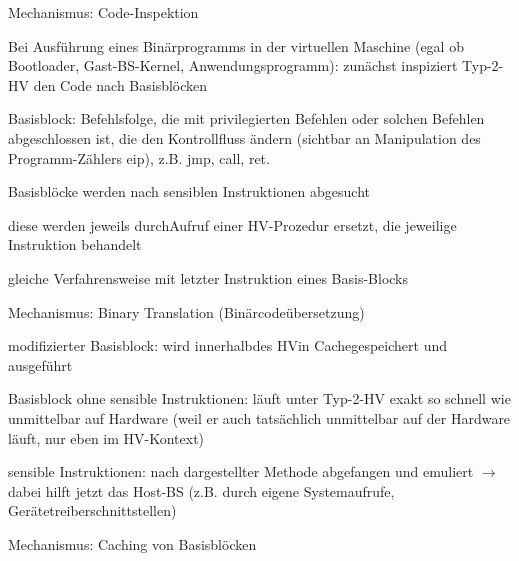 \documentclass[a4paper]{article}
\begin{document}
\begin{multicols}{3}
    Mechanismus: Code-Inspektion

    \begin{itemize*}
        \item
        Bei Ausführung eines Binärprogramms in der virtuellen Maschine (egal
        ob Bootloader, Gast-BS-Kernel, Anwendungsprogramm): zunächst
        inspiziert Typ-2-HV den Code nach Basisblöcken
        \begin{itemize*}
            \item Basisblock: Befehlsfolge, die mit privilegierten Befehlen oder solchen Befehlen abgeschlossen ist, die den Kontrollfluss ändern (sichtbar an Manipulation des Programm-Zählers eip), z.B. jmp, call, ret.
        \end{itemize*}
        \item
        Basisblöcke werden nach sensiblen Instruktionen abgesucht
        \item
        diese werden jeweils durchAufruf einer HV-Prozedur ersetzt, die
        jeweilige Instruktion behandelt
        \item
        gleiche Verfahrensweise mit letzter Instruktion eines Basis-Blocks
    \end{itemize*}

    Mechanismus: Binary Translation (Binärcodeübersetzung)

    \begin{itemize*}
        \item
        modifizierter Basisblock: wird innerhalbdes HVin Cachegespeichert und
        ausgeführt
        \item
        Basisblock ohne sensible Instruktionen: läuft unter Typ-2-HV exakt so
        schnell wie unmittelbar auf Hardware (weil er auch tatsächlich
        unmittelbar auf der Hardware läuft, nur eben im HV-Kontext)
        \item
        sensible Instruktionen: nach dargestellter Methode abgefangen und
        emuliert $\rightarrow$ dabei hilft jetzt das Host-BS
        (z.B. durch eigene Systemaufrufe, Gerätetreiberschnittstellen)
    \end{itemize*}

    Mechanismus: Caching von Basisblöcken


\end{multicols}
\end{document}
